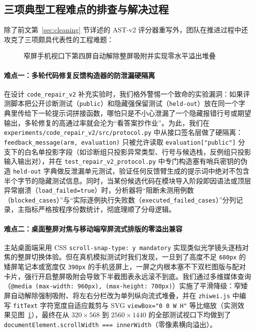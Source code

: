 \subsection{三项典型工程难点的排查与解决过程}

除了前文第~\ref{sec:cleaning} 节详述的 AST-v2 评分器重写外，团队在推进过程中还攻克了三项颇具代表性的工程难题：

\begin{figure}
\vspace{-8pt}
\centering
{}
\caption{窄屏手机视口下第四屏自动解除整屏吸附并实现零水平溢出堆叠}
\label{fig:mobile-s4}
\vspace{-8pt}
\end{figure}

\paragraph{难点一：多轮代码修复反馈构造器的防泄漏硬隔离}在设计 \texttt{code\_repair\_v2} 补充实验时，我们格外警惕一个致命的实验漏洞：如果评测脚本把公开诊断测试（\texttt{public}）和隐藏强保留测试（\texttt{held-out}）放在同一个字典里传给下一轮提示词拼接函数，哪怕只是不小心泄漏了一个隐藏报错行号或期望输出，多轮修复的高通过率就会沦为“看答案抄作业”。为此，我们在 \texttt{experiments/code\_repair\_v2/src/protocol.py} 中从接口签名层做了硬隔离：\texttt{feedback\_message(arm, evaluation)} 只被允许读取 \texttt{evaluation["public"]} 分支下的白名单投影字段（如诊断组只投影异常类型、行号与候选栈，反例组只投影输入输出对），并在 \texttt{test\_repair\_v2\_protocol.py} 中专门构造塞有哨兵密钥的伪造 \texttt{held-out} 字典做反泄漏单元测试，验证任何反馈臂生成的提示词中绝对不包含半个字节的隐藏测试信息。同时，当某份候选代码在模块导入阶段即因语法或顶层异常崩溃（\texttt{load\_failed=true}）时，分析器将“阻断未测用例数（\texttt{blocked\_cases}）”与“实际逐例执行失败数（\texttt{executed\_failed\_cases}）”分列记录，主指标严格按程序份数统计，彻底理顺了分母逻辑。

\paragraph{难点二：桌面整屏对焦与移动端窄屏流式排版的零溢出兼容}主站桌面端采用 CSS \texttt{scroll-snap-type: y mandatory} 实现类似光学镜头逐档对焦的整屏切换体验。但在真机模拟测试时我们发现，一旦到了高度不足 \texttt{680px} 的矮屏笔记本或宽度仅 \texttt{390px} 的手机竖屏上，一屏之内根本塞不下双栏图版与配对卡片，强行开启整屏吸附会导致下半截图表永远滚不到底。我们通过多维媒体查询（\texttt{@media (max-width: 960px), (max-height: 700px)}）实施了平滑降级：窄矮屏自动解除强制吸附、将左右分栏改为单列纵向流式堆叠，并在 \texttt{zhiwei.js} 中编写 \texttt{fitText} 字符宽度自适应裁剪与 SVG \texttt{viewBox="0 0 W H"} 等比缩放（实测效果见图~\ref{fig:mobile-s4}），最终在从 $320\times 568$ 到 $2560\times 1440$ 的全部测试视口下均做到了 \texttt{documentElement.scrollWidth === innerWidth}（零像素横向溢出）。

